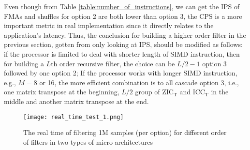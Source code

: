 
Even though from Table \ref{table:number_of_instructions}, we can get the IPS of FMAs and shuffles for option 2 are both lower than
option 3, the CPS is a more important metric in real implementation since it directly relates to the application's latency.
Thus, the conclusion for building a higher order filter in the previous section, gotten from only looking at IPS,
should be modified as follows: if the processor is limited to deal with shorter length of SIMD instruction,
then for building a $L$th order recursive filter, the choice can be $L/2{-}1$ option 3 followed by one option 2;
If the processor works with longer SIMD instruction, e.g., $M{=}8$ or 16,
the more efficient combination is to all cascade option 3, i.e., one matrix transpose at the beginning, $L/2$ group of $\text{ZIC}_{\text{T}}$ and $\text{ICC}_{\text{T}}$ in the middle and another matrix transpose at the end.




\begin{figure}[t]
    \centerline{\texttt{[image: real\_time\_test\_1.png]}}
    \caption{The real time of filtering 1M samples (per option) for different order of filters in two types of micro-architectures}
    \label{fig:Real_time_test}
  \end{figure}


